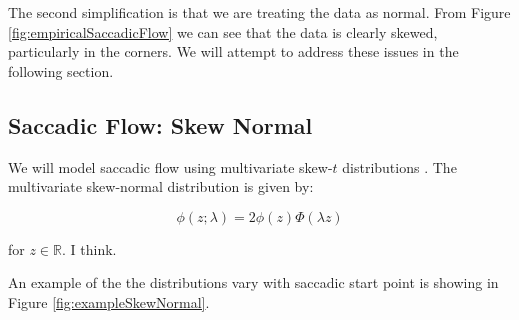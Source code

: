 \documentclass[a4paper, onecolumn, oneside, 11pt]{article}
\begin{document}
The second simplification is that we are treating the data as normal. From Figure \ref{fig:empiricalSaccadicFlow} we can see that the data is clearly skewed, particularly in the corners. We will attempt to address these issues in the following section.

\subsection{Saccadic Flow: Skew Normal}
We will model saccadic flow using multivariate skew-$t$ distributions \citep{azzalini2015}. The multivariate skew-normal distribution \citep{azzalini1996} is given by:

\begin{equation}
\phi(z; \lambda) = 2\phi(z)\Phi(\lambda z) 
\end{equation}

for $z \in \mathbb{R}$. I think. 


An example of the the distributions vary with saccadic start point is showing in Figure \ref{fig:exampleSkewNormal}.

\end{document}
